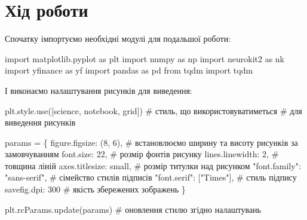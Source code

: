 \documentclass[
  letterpaper,
]{report}
\newenvironment{Shaded}{\begin{snugshade}}{\end{snugshade}}
\newcommand{\CommentTok}[1]{\textcolor[rgb]{0.37,0.37,0.37}{#1}}
\newcommand{\DecValTok}[1]{\textcolor[rgb]{0.68,0.00,0.00}{#1}}
\newcommand{\ImportTok}[1]{\textcolor[rgb]{0.00,0.46,0.62}{#1}}
\newcommand{\NormalTok}[1]{\textcolor[rgb]{0.00,0.23,0.31}{#1}}
\newcommand{\OperatorTok}[1]{\textcolor[rgb]{0.37,0.37,0.37}{#1}}
\newcommand{\StringTok}[1]{\textcolor[rgb]{0.13,0.47,0.30}{#1}}
\begin{document}
\hypertarget{ux445ux456ux434-ux440ux43eux431ux43eux442ux438-3}{%
\section{Хід
роботи}\label{ux445ux456ux434-ux440ux43eux431ux43eux442ux438-3}}

Спочатку імпортуємо необхідні модулі для подальшої роботи:

\begin{Shaded}
\begin{Highlighting}[]
\ImportTok{import}\NormalTok{ matplotlib.pyplot }\ImportTok{as}\NormalTok{ plt }
\ImportTok{import}\NormalTok{ numpy }\ImportTok{as}\NormalTok{ np}
\ImportTok{import}\NormalTok{ neurokit2 }\ImportTok{as}\NormalTok{ nk}
\ImportTok{import}\NormalTok{ yfinance }\ImportTok{as}\NormalTok{ yf}
\ImportTok{import}\NormalTok{ pandas }\ImportTok{as}\NormalTok{ pd}
\ImportTok{from}\NormalTok{ tqdm }\ImportTok{import}\NormalTok{ tqdm}
\end{Highlighting}
\end{Shaded}

І виконаємо налаштування рисунків для виведення:

\begin{Shaded}
\begin{Highlighting}[]
\NormalTok{plt.style.use([}\StringTok{\textquotesingle{}science\textquotesingle{}}\NormalTok{, }\StringTok{\textquotesingle{}notebook\textquotesingle{}}\NormalTok{, }\StringTok{\textquotesingle{}grid\textquotesingle{}}\NormalTok{]) }\CommentTok{\# стиль, що використовуватиметься}
                                               \CommentTok{\# для виведення рисунків}

\NormalTok{params }\OperatorTok{=}\NormalTok{ \{}
    \StringTok{\textquotesingle{}figure.figsize\textquotesingle{}}\NormalTok{: (}\DecValTok{8}\NormalTok{, }\DecValTok{6}\NormalTok{),         }\CommentTok{\# встановлюємо ширину та висоту рисунків за замовчуванням}
    \StringTok{\textquotesingle{}font.size\textquotesingle{}}\NormalTok{: }\DecValTok{22}\NormalTok{,                  }\CommentTok{\# розмір фонтів рисунку}
    \StringTok{\textquotesingle{}lines.linewidth\textquotesingle{}}\NormalTok{: }\DecValTok{2}\NormalTok{,             }\CommentTok{\# товщина ліній}
    \StringTok{\textquotesingle{}axes.titlesize\textquotesingle{}}\NormalTok{: }\StringTok{\textquotesingle{}small\textquotesingle{}}\NormalTok{,        }\CommentTok{\# розмір титулки над рисунком}
    \StringTok{"font.family"}\NormalTok{: }\StringTok{"sans{-}serif"}\NormalTok{,      }\CommentTok{\# сімейство стилів підписів }
    \StringTok{"font.serif"}\NormalTok{: [}\StringTok{"Times"}\NormalTok{],          }\CommentTok{\# стиль підпису}
    \StringTok{\textquotesingle{}savefig.dpi\textquotesingle{}}\NormalTok{: }\DecValTok{300}                \CommentTok{\# якість збережених зображень}
\NormalTok{\}}

\NormalTok{plt.rcParams.update(params)           }\CommentTok{\# оновлення стилю згідно налаштувань}
\end{Highlighting}
\end{Shaded}
\end{document}
